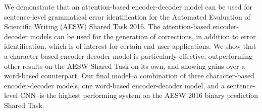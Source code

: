 We demonstrate that an attention-based encoder-decoder model can be used for sentence-level grammatical error identification for the Automated Evaluation of Scientific Writing (AESW) Shared Task 2016. The attention-based encoder-decoder models can be used for the generation of corrections, in addition to error identification, which is of interest for certain end-user applications. We show that a character-based encoder-decoder model is particularly effective, outperforming other results on the AESW Shared Task on its own, and showing gains over a word-based counterpart. Our final model--a combination of three character-based encoder-decoder models, one word-based encoder-decoder model, and a sentence-level CNN--is the highest performing system on the AESW 2016 binary prediction Shared Task.

